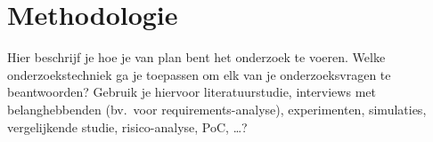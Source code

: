 






\section{Methodologie}%
\label{sec:methodologie}

Hier beschrijf je hoe je van plan bent het onderzoek te voeren. Welke onderzoekstechniek ga je toepassen om elk van je onderzoeksvragen te beantwoorden? Gebruik je hiervoor literatuurstudie, interviews met belanghebbenden (bv.~voor requirements-analyse), experimenten, simulaties, vergelijkende studie, risico-analyse, PoC, \ldots?

